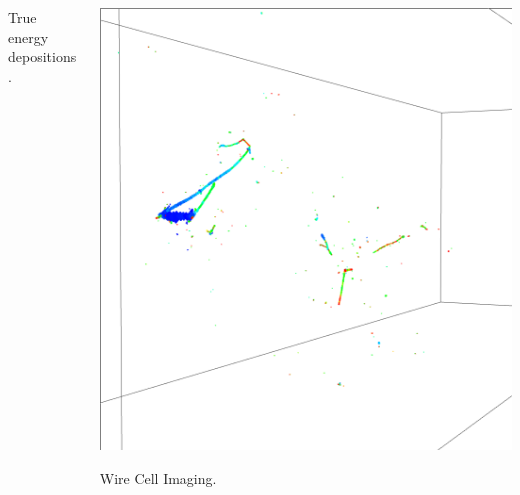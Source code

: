 \begin{frame}[fragile]
\begin{columns}
\begin{column}{0.5\textwidth}
\begin{center}
        True energy depositions.
      \end{center}
    \end{column}
    \begin{column}{0.5\textwidth}
      \begin{center}
        \includegraphics[width=\textwidth,trim=3cm 10cm 3cm 10cm,clip]{payoff-reco.png}

        Wire Cell Imaging.
      \end{center}
    \end{column}
  \end{columns}

  \vfill


\end{frame}
